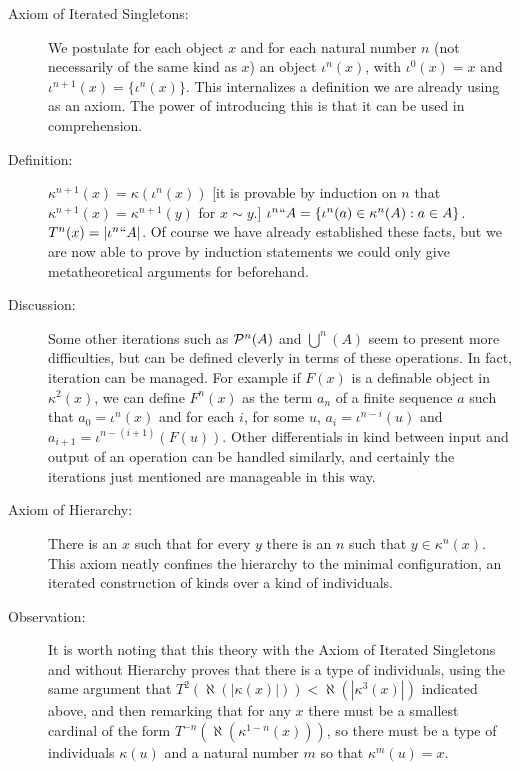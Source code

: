 \documentclass[12pt]{article}
\begin{document}
\begin{description}

\item[Axiom of Iterated Singletons:]  We postulate for each object $x$ and for each natural number $n$ (not necessarily of the same kind as $x$) an object $\iota^n(x)$, with $\iota^0(x)=x$ and $\iota^{n+1}(x) = \{\iota^n(x)\}$.  This internalizes a definition we are already using as an axiom.  The power of introducing this is that it can be used in comprehension.

\item[Definition:]  $\kappa^{n+1}(x) = \kappa(\iota^n(x))$ [it is provable by induction on $n$ that $\kappa^{n+1}(x) = \kappa^{n+1}(y)$ for $x \sim y$.]  $\iota^n``A = \{\iota^n(a) \in \kappa^{n}(A):a \in A\}$.  $T^n(x) = |\iota^n``A|$.  Of course we have already established these facts, but we are now able to prove by induction
statements we could only give metatheoretical arguments for beforehand.

\item[Discussion:]  Some other iterations such as ${\cal P}^n(A)$ and $\bigcup^n(A)$ seem to present more difficulties, but can be defined cleverly in terms of these operations.  In fact, iteration can be managed.  For example if $F(x)$ is a definable object in $\kappa^2(x)$, we can define $F^n(x)$ as the term $a_n$ of a finite sequence $a$ such that $a_0 = \iota^n(x)$
and for each $i$, for some $u$, $a_i=\iota^{n-i}(u)$ and $a_{i+1}= \iota^{n-(i+1)}(F(u))$.  Other differentials in kind between input and output of an operation can be handled similarly, and certainly the iterations just mentioned are manageable in this way.

\item[Axiom of Hierarchy:]  There is an $x$ such that for every $y$ there is an $n$ such that $y\in\kappa^n(x)$.  This axiom neatly confines the hierarchy to the minimal configuration, an iterated construction of kinds over a kind of individuals.

\item[Observation:]  It is worth noting that this theory with the Axiom of Iterated Singletons and without Hierarchy proves that there is a type of individuals, using the same argument that $T^2(\aleph(|\kappa(x)|)) < \aleph(|\kappa^3(x)|)$ indicated above, and then remarking that for any $x$ there must be a smallest cardinal of the form $T^{-n}(\aleph(\kappa^{1-n}(x)))$, so there must be a type of individuals $\kappa(u)$ and a natural number $m$ so that $\kappa^m(u)=x$.


\end{description}
\end{document}
